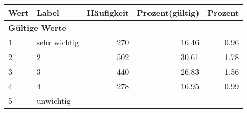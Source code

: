      \begin{longtable}{lXrrr}
     \toprule
     \textbf{Wert} & \textbf{Label} & \textbf{Häufigkeit} & \textbf{Prozent(gültig)} & \textbf{Prozent} \\
     \endhead
     \midrule
     \multicolumn{5}{l}{\textbf{Gültige Werte}}\\

     1 &
     \multicolumn{1}{X}{ sehr wichtig   } &


       \num{270} &
       \num[round-mode=places,round-precision=2]{16,46} &
         \num[round-mode=places,round-precision=2]{0,96} \\

     2 &
     \multicolumn{1}{X}{ 2   } &


       \num{502} &
       \num[round-mode=places,round-precision=2]{30,61} &
         \num[round-mode=places,round-precision=2]{1,78} \\

     3 &
     \multicolumn{1}{X}{ 3   } &


       \num{440} &
       \num[round-mode=places,round-precision=2]{26,83} &
         \num[round-mode=places,round-precision=2]{1,56} \\

     4 &
     \multicolumn{1}{X}{ 4   } &


       \num{278} &
       \num[round-mode=places,round-precision=2]{16,95} &
         \num[round-mode=places,round-precision=2]{0,99} \\

     5 &
     \multicolumn{1}{X}{ unwichtig   } &



\end{longtable}
